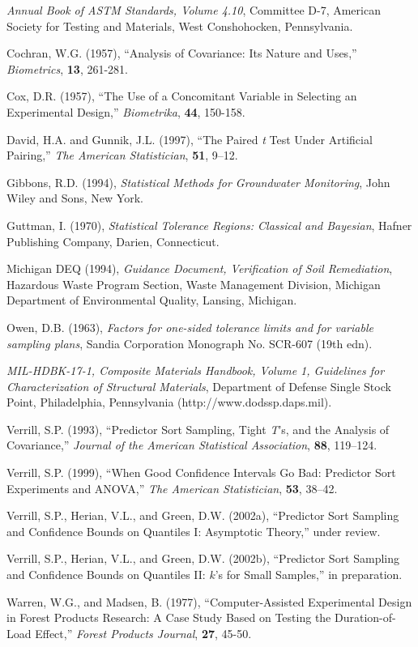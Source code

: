 \documentclass[]{asaproc}
\begin{document}
\begin{references}
{\footnotesize
\itemsep=3pt

\item {\em Annual Book of ASTM Standards, Volume 4.10}, Committee D-7,
American Society for Testing and Materials, West Conshohocken, Pennsylvania.
\item Cochran, W.G. (1957),  ``Analysis of Covariance: Its Nature and Uses,''
{\em Biometrics}, {\bf 13}, 261-281.
\item Cox, D.R. (1957),  ``The Use of a Concomitant Variable in Selecting an
Experimental Design,''  {\em Biometrika}, {\bf 44}, 150-158.
\item David, H.A. and Gunnik, J.L. (1997), ``The Paired {\em t} Test
Under Artificial Pairing,'' {\em The American Statistician}, {\bf 51},
9--12.
\item Gibbons, R.D. (1994), {\em Statistical Methods for Groundwater
Monitoring},
John Wiley and Sons, New York.
\item Guttman, I. (1970), {\em Statistical Tolerance Regions:
Classical and Bayesian}, Hafner Publishing Company, Darien,
Connecticut.
\item Michigan DEQ (1994), {\em Guidance Document, Verification of
Soil Remediation}, Hazardous Waste Program Section, Waste Management
Division, Michigan Department of Environmental Quality, Lansing, Michigan.
\item Owen, D.B. (1963), {\em Factors for one-sided tolerance limits
and for variable sampling plans}, Sandia Corporation Monograph No.
SCR-607 (19th edn).
\item {\em MIL-HDBK-17-1, Composite Materials Handbook, Volume 1,
Guidelines for Characterization of Structural Materials}, Department
of Defense Single Stock Point, Philadelphia, Pennsylvania
(http://www.dodssp.daps.mil).
\item Verrill, S.P. (1993),  ``Predictor Sort Sampling, Tight
{\em T}'s, and the Analysis of Covariance,'' {\em Journal of the American
Statistical Association}, {\bf 88}, 119--124.
\item Verrill, S.P. (1999),  ``When Good Confidence Intervals Go Bad:
Predictor Sort Experiments and ANOVA,'' {\em The American
Statistician}, {\bf 53}, 38--42.
\item Verrill, S.P., Herian, V.L., and Green, D.W. (2002a), ``Predictor
Sort Sampling and Confidence Bounds on Quantiles I: Asymptotic Theory,''
under review.
\item Verrill, S.P., Herian, V.L., and Green, D.W. (2002b), ``Predictor
Sort Sampling and Confidence Bounds on Quantiles II: $k$'s for Small
Samples,'' in preparation.
\item Warren, W.G., and Madsen, B. (1977),  ``Computer-Assisted Experimental Design
in Forest Products Research: A Case Study Based on Testing the 
Duration-of-Load Effect,''  {\em Forest Products Journal}, {\bf 27}, 45-50.

}
\end{references}
\end{document}
